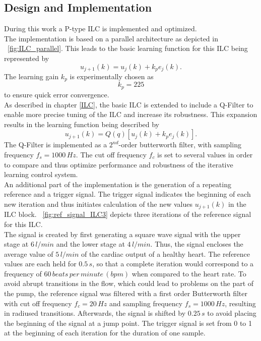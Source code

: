 \subsection{Design and Implementation}
During this work a P-type ILC is implemented and optimized.
\\The implementation is based on a parallel architecture as depicted in \figurename~\ref{fig:ILC_parallel}. This leads to the basic learning function for this ILC being represented by
\begin{equation}
  u_{j+1}(k) = u_{j}(k)+k_{p}e_{j}(k).
\end{equation}
The learning gain $k_p$ is experimentally chosen as
\begin{equation}
  k_p = 225
\end{equation}
to ensure quick error convergence.
\\As described in chapter \ref{ILC}, the basic ILC is extended to include a Q-Filter to enable more precise tuning of the ILC and increase its robustness.
This expansion results in the learning function being described by
\begin{equation}
  u_{j+1}(k) = Q(q)[u_{j}(k)+k_{p}e_{j}(k)].
\end{equation}
The Q-Filter is implemented as a $2^{nd}$-order butterworth filter, with sampling frequency $f_s=1000\,Hz$. The cut off frequency $f_c$ is set to several values in order to compare and thus optimize performance and robustness of the iterative learning control system.
\\An additional part of the implementation is the generation of a repeating reference and a trigger signal. The trigger signal indicates the beginning of each new iteration and thus initiates calculation of the new values $u_{j+1}(k)$ in the ILC block.
\figurename~\ref{fig:ref_signal_ILC3} depicts three iterations of the reference signal for this ILC.
\\The signal is created by first generating a square wave signal with the upper stage at $6\, l/min$ and the lower stage at $4\, l/min$. Thus, the signal encloses the average value of $5\, l/min$ of the cardiac output of a healthy heart. The reference values are each held for $0.5\, s$, so that a complete iteration would correspond to a frequency of $60\, beats\, per\, minute\, (bpm)$ when compared to the heart rate. To avoid abrupt transitions in the flow, which could lead to problems on the part of the pump, the reference signal was filtered with a first order Butterworth filter with cut off frequency $f_c=20\,Hz$ and sampling frequency $f_s=1000\,Hz$, resulting in radiused transitions. Afterwards, the signal is shifted by $0.25\, s$ to avoid placing the beginning of the signal at a jump point. The trigger signal is set from 0 to 1 at the beginning of each iteration for the duration of one sample.
